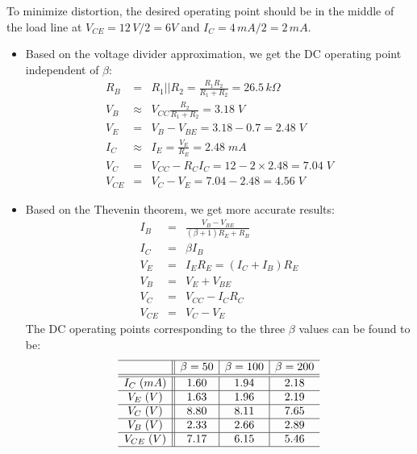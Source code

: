 \documentclass{article}
\begin{document}
To minimize distortion, the desired operating point should be in the 
middle of the load line at $V_{CE}=12\,V/2=6V$ and $I_C=4\,mA/2=2\,mA$.

\begin{itemize}
\item Based on the voltage divider approximation, we get the DC
operating point independent of $\beta$:
\begin{eqnarray}
  R_B &=& R_1||R_2=\frac{R_1R_2}{R_1+R_2}=26.5\,k\Omega	
  \nonumber\\
  V_B &\approx& V_{CC} \frac{R_2}{R_1+R_2}=3.18\;V
  \nonumber\\
  V_E &=& V_B-V_{BE}=3.18-0.7=2.48\;V
  \nonumber\\
  I_C &\approx& I_E=\frac{V_E}{R_E}=2.48\;mA
  \nonumber\\
  V_C &=& V_{CC}-R_CI_C=12-2\times 2.48 = 7.04\;V
  \nonumber\\
  V_{CE}&=&V_C-V_E=7.04-2.48=4.56\;V 
\end{eqnarray}

\item Based on the Thevenin theorem, we get more accurate results:
\begin{eqnarray}
  I_B&=&\frac{V_B-V_{BE}}{(\beta+1) R_E+R_B}
  \nonumber\\
  I_C&=&\beta I_B
  \nonumber\\
  V_E&=&I_E R_E=(I_C+I_B)R_E
  \nonumber\\
  V_B&=&V_E+V_{BE}
  \nonumber\\
  V_C&=&V_{CC}-I_CR_C
  \nonumber\\
  V_{CE}&=&V_C-V_E
\end{eqnarray} 
The DC operating points corresponding to the three $\beta$ values 
can be found to be:
\begin{equation}
  \begin{array}{c||c|c|c}\hline
    & \beta=50  & \beta=100 & \beta=200 \\\hline\hline
    I_C\;(mA)  & 1.60 & 1.94     & 2.18      \\\hline
    V_E\;(V)   & 1.63 & 1.96     & 2.19      \\\hline
    V_C\;(V)   & 8.80 & 8.11     & 7.65      \\\hline
    V_B\;(V)   & 2.33 & 2.66     & 2.89      \\\hline
    V_{CE}\;(V) & 7.17 & 6.15     & 5.46      \\\hline
  \end{array}
\end{equation}

\end{itemize}
\end{document}
